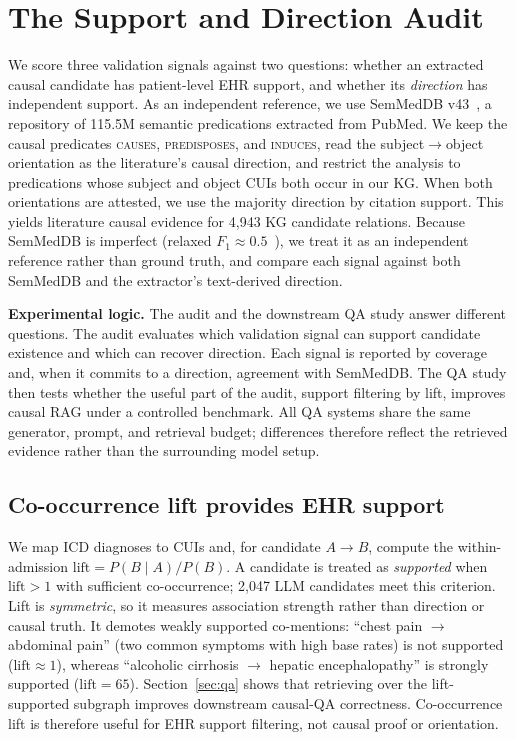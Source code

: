 \documentclass[runningheads]{llncs}
\begin{document}
\section{The Support and Direction Audit}\label{sec:audit}
We score three validation signals against two questions: whether an extracted causal candidate has patient-level EHR support, and whether its \emph{direction} has independent support. As an independent reference, we use SemMedDB v43~\cite{kilicoglu2012semmeddb}, a repository of 115.5M semantic predications extracted from PubMed. We keep the causal predicates \textsc{causes}, \textsc{predisposes}, and \textsc{induces}, read the subject$\rightarrow$object orientation as the literature's causal direction, and restrict the analysis to predications whose subject and object CUIs both occur in our KG. When both orientations are attested, we use the majority direction by citation support. This yields literature causal evidence for 4{,}943 KG candidate relations. Because SemMedDB is imperfect (relaxed $F_1\approx0.5$~\cite{kilicoglu2012semmeddb}), we treat it as an independent reference rather than ground truth, and compare each signal against both SemMedDB and the extractor's text-derived direction.%

\smallskip\noindent\textbf{Experimental logic.} The audit and the downstream QA study answer different questions. The audit evaluates which validation signal can support candidate existence and which can recover direction. Each signal is reported by coverage and, when it commits to a direction, agreement with SemMedDB. The QA study then tests whether the useful part of the audit, support filtering by lift, improves causal RAG under a controlled benchmark. All QA systems share the same generator, prompt, and retrieval budget; differences therefore reflect the retrieved evidence rather than the surrounding model setup. %

\subsection{Co-occurrence lift provides EHR support}
We map ICD diagnoses to CUIs and, for candidate $A\rightarrow B$, compute the within-admission $\mathrm{lift}=P(B\mid A)/P(B)$. A candidate is treated as \emph{supported} when $\mathrm{lift}>1$ with sufficient co-occurrence; 2{,}047 LLM candidates meet this criterion. Lift is \emph{symmetric}, so it measures association strength rather than direction or causal truth. It demotes weakly supported co-mentions: ``chest pain $\rightarrow$ abdominal pain'' (two common symptoms with high base rates) is not supported ($\mathrm{lift}\approx1$), whereas ``alcoholic cirrhosis $\rightarrow$ hepatic encephalopathy'' is strongly supported ($\mathrm{lift}=65$). Section~\ref{sec:qa} shows that retrieving over the lift-supported subgraph improves downstream causal-QA correctness. Co-occurrence lift is therefore useful for EHR support filtering, not causal proof or orientation.
\end{document}
